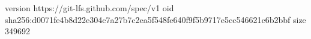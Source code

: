 version https://git-lfs.github.com/spec/v1
oid sha256:d0071fe4b8d22e304c7a27b7c2ea5f548fe640f9f5b9717e5cc546621c6b2bbf
size 349692
